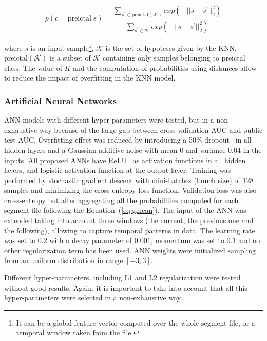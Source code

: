 \documentclass[a4paper,english,twoside]{article}
\begin{document}
\begin{equation}
p(c=\text{preictal} | s) =
\displaystyle{\frac{\displaystyle{\sum_{ s^\prime \in \text{preictal}(\mathcal{K}) } exp( -||s - s^\prime||^2_2 ) }}
{\displaystyle{\sum_{s^\prime \in \mathcal{K}} exp( -||s - s^\prime||^2_2 ) }}}
\end{equation}

\noindent where $s$ is an input sample\footnote{It can be a global feature
  vector computed over the whole segment file, or a temporal window taken from
  the file.}, $\mathcal{K}$ is the set of hypoteses given by the KNN,
$\text{preictal}(\mathcal{K})$ is a subset of $\mathcal{K}$ containing only
samples belonging to preictal class. The value of $K$ and the computation of
probabilities using distances allow to reduce the impact of overfitting in the
KNN model.

\subsubsection{Artificial Neural
  Networks}\label{artificial-neural-networks}

ANN models with different hyper-parameters were tested, but in a non exhaustive
way because of the large gap between cross-validation AUC and public test
AUC. Overfitting effect was reduced by introducing a 50\%
dropout~\cite{2012:arxiv:hinton:dropout} in all hidden layers and a Gaussian
additive noise with mean $0$ and variance $0.04$ in the inputs. All proposed
ANNs have ReLU~\cite{2011:glorot:aistats} as activation functions in all hidden
layers, and logistic activation function at the output layer. Training was
performed by stochastic gradient descent with mini-batches (bunch size) of 128
samples and minimizing the cross-entropy loss function. Validation loss was also
cross-entropy but after aggregating all the probabilities computed for each
segment file following the Equation~(\ref{eq:gmean}). The input of the ANN was
extended taking into account three windows (the current, the previous one and
the following), allowing to capture temporal patterns in data. The learning rate
was set to $0.2$ with a decay parameter of $0.001$, momentum was set to $0.1$
and no other regularization term has been used. ANN weights were initialized
sampling from an uniform distribution in range $[-3,3]$.

Different hyper-parameters, including L1 and L2 regularization were tested without
good results. Again, it is important to take into account that all this
hyper-parameters were selected in a non-exhaustive way.
\end{document}
